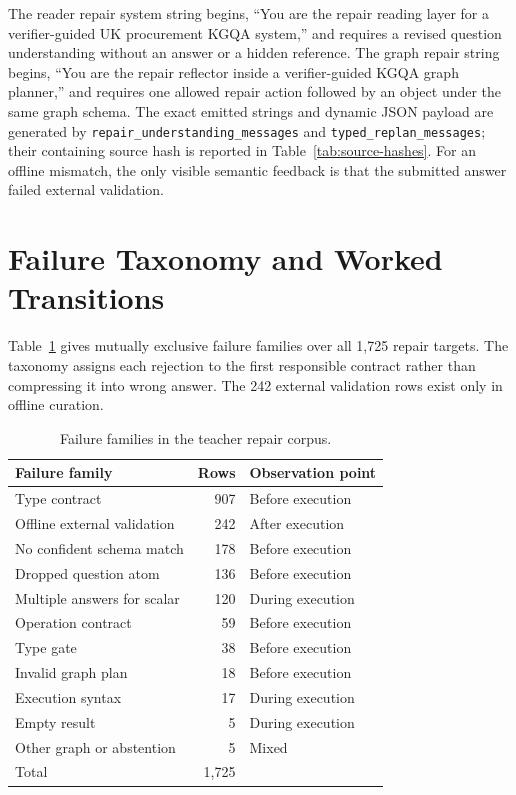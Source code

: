 \documentclass{article}
\begin{document}
The reader repair system string begins, ``You are the repair reading layer for a verifier-guided UK
procurement KGQA system,'' and requires a revised question understanding without an answer or a
hidden reference.  The graph repair string begins, ``You are the repair reflector inside a
verifier-guided KGQA graph planner,'' and requires one allowed repair action followed by an object
under the same graph schema.  The exact emitted strings and dynamic JSON payload are generated by
\texttt{repair\_understanding\_messages} and \texttt{typed\_replan\_messages}; their containing source
hash is reported in Table~\ref{tab:source-hashes}.  For an offline mismatch, the only visible
semantic feedback is that the submitted answer failed external validation.

\section{Failure Taxonomy and Worked Transitions}
\label{app:failures}

Table~\ref{tab:failure-taxonomy} gives mutually exclusive failure families over all 1,725 repair
targets.  The taxonomy assigns each rejection to the first responsible contract rather than
compressing it into wrong answer.  The 242 external validation rows exist only in offline curation.

\begin{table}[h]
  \centering
  \caption{Failure families in the teacher repair corpus.}
  \label{tab:failure-taxonomy}
  \small
  \begin{tabular}{lrl}
    \toprule
    Failure family & Rows & Observation point \\
    \midrule
    Type contract & 907 & Before execution \\
    Offline external validation & 242 & After execution \\
    No confident schema match & 178 & Before execution \\
    Dropped question atom & 136 & Before execution \\
    Multiple answers for scalar & 120 & During execution \\
    Operation contract & 59 & Before execution \\
    Type gate & 38 & Before execution \\
    Invalid graph plan & 18 & Before execution \\
    Execution syntax & 17 & During execution \\
    Empty result & 5 & During execution \\
    Other graph or abstention & 5 & Mixed \\
    \midrule
    Total & 1,725 & \\
    \bottomrule
  \end{tabular}
\end{table}
\end{document}
